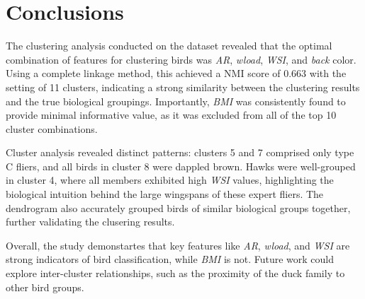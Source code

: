 \section{Conclusions}

The clustering analysis conducted on the dataset revealed that the optimal
combination of features for clustering birds was \emph{AR}, \emph{wload},
\emph{WSI}, and \emph{back} color. Using a complete linkage method, this
achieved a NMI score of 0.663 with the setting of 11 clusters,
indicating a strong similarity between the clustering results and the
true biological groupings. Importantly, \emph{BMI} was consistently
found to provide minimal informative value, as it was excluded from
all of the top 10 cluster combinations.

Cluster analysis revealed distinct patterns: clusters 5 and 7 comprised
only type C fliers, and all birds in cluster 8 were dappled brown.
Hawks were well-grouped in cluster 4, where all members exhibited high
\emph{WSI} values, highlighting the biological intuition behind the
large wingspans of these expert fliers. The dendrogram also accurately
grouped birds of similar biological groups together, further validating
the clusering results.

Overall, the study demonstartes that key features like \emph{AR}, \emph{wload},
and \emph{WSI} are strong indicators of bird classification, while \emph{BMI}
is not. Future work could explore inter-cluster relationships, such as
the proximity of the duck family to other bird groups.